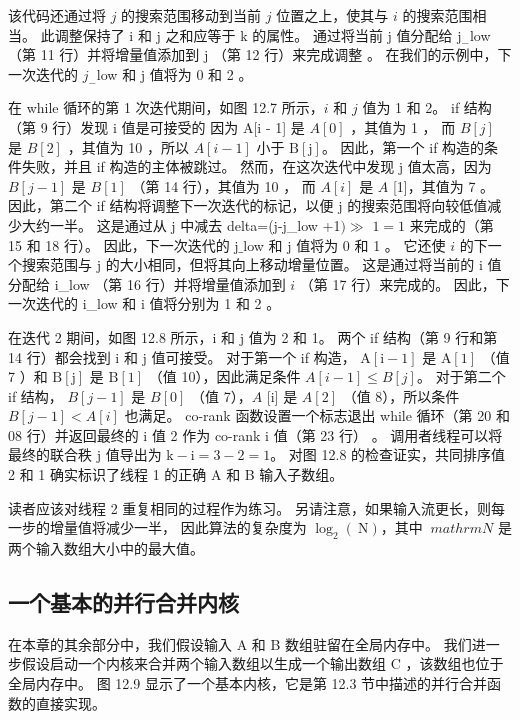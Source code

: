 该代码还通过将 $j$ 的搜索范围移动到当前 $j$ 位置之上，使其与 $i$ 的搜索范围相当。 
此调整保持了 $\mathrm{i}$ 和 $\mathrm{j}$ 之和应等于 $\mathrm{k}$ 的属性。 
通过将当前 $\mathrm{j}$ 值分配给 $\mathrm{j}_{-}$low （第 11 行）并将增量值添加到 $\mathrm{j}$ （第 12 行）来完成调整 。 在我们的示例中，下一次迭代的 $j_{-}$low 和 $\mathrm{j}$ 值将为 0 和 2 。

在 while 循环的第 1 次迭代期间，如图 12.7 所示，$i$ 和 $j$ 值为 1 和 2。
if 结构（第 9 行）发现 $\mathrm{i}$ 值是可接受的 因为 $\mathrm{A}[\mathrm{i}$ - 1] 是 $A[0]$ ，其值为 1 ，
而 $B[j]$ 是 $B[2]$ ，其值为 10 ，所以 $ A[i-1]$ 小于 $\mathrm{B}[\mathrm{j}]$。 
因此，第一个 if 构造的条件失败，并且 if 构造的主体被跳过。 
然而，在这次迭代中发现 $\mathrm{j}$ 值太高，因为 $B[j-1]$ 是 $B[1]$ （第 14 行），其值为 10 ，
而 $A [i]$ 是 $A$ [1]，其值为 7 。 
因此，第二个 if 结构将调整下一次迭代的标记，以便 $\mathrm{j}$ 的搜索范围将向较低值减少大约一半。 
这是通过从 $\mathrm{j}$ 中减去 delta=(j-j\_low +1$) \gg$ $1=1$ 来完成的（第 15 和 18 行）。 
因此，下一次迭代的 $\mathrm{j} \_$low 和 $\mathrm{j}$ 值将为 0 和 1 。 
它还使 $i$ 的下一个搜索范围与 $\mathrm{j}$ 的大小相同，但将其向上移动增量位置。 
这是通过将当前的 $\mathrm{i}$ 值分配给 i\_low （第 16 行）并将增量值添加到 $i$ （第 17 行）来完成的。 
因此，下一次迭代的 i\_low 和 $\mathrm{i}$ 值将分别为 1 和 2 。

在迭代 2 期间，如图 12.8 所示，$\mathrm{i}$ 和 $\mathrm{j}$ 值为 2 和 1。
两个 if 结构（第 9 行和第 14 行）都会找到 $\mathrm{i}$ 和 $\mathrm{j}$ 值可接受。 
对于第一个 if 构造， $\mathrm{A}[\mathrm{i}-1]$ 是 $\mathrm{A}[1]$ （值 7 ）和 $\mathrm{B}[\mathrm{j}] $ 是 $\mathrm{B}[1]$ （值 10），因此满足条件 $A[i-1] \leq B[j]$。 
对于第二个 if 结构， $B[j-1]$ 是 $B[0]$ （值 7），$A$ [i] 是 $A[2]$ （值 8），所以条件 $B [j-1]<A[i]$ 也满足。 
co-rank 函数设置一个标志退出 while 循环（第 20 和 08 行）并返回最终的 $\mathrm{i}$ 值 2 作为 co-rank $\mathrm{i}$ 值（第 23 行） 。 
调用者线程可以将最终的联合秩 $\mathrm{j}$ 值导出为 $\mathrm{k}-\mathrm{i}=3-2=1$。 
对图 12.8 的检查证实，共同排序值 2 和 1 确实标识了线程 1 的正确 A 和 B 输入子数组。

读者应该对线程 2 重复相同的过程作为练习。 
另请注意，如果输入流更长，则每一步的增量值将减少一半，
因此算法的复杂度为 $\log _{2}(\mathrm{~N})$，其中 $\ mathrm{N}$ 是两个输入数组大小中的最大值。

\subsection{一个基本的并行合并内核}
在本章的其余部分中，我们假设输入 A 和 B 数组驻留在全局内存中。 
我们进一步假设启动一个内核来合并两个输入数组以生成一个输出数组 $\mathrm{C}$ ，该数组也位于全局内存中。 
图 12.9 显示了一个基本内核，它是第 12.3 节中描述的并行合并函数的直接实现。

